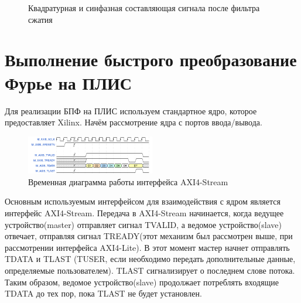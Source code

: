 \begin{figure}[h]
    \centering
    \noindent
    \caption{Квадратурная и синфазная составляющая сигнала после фильтра сжатия}
    \label{fig:correl}
\end{figure}

\section{Выполнение быстрого преобразование Фурье на ПЛИС}

Для реализации БПФ на ПЛИС используем стандартное ядро, которое предоставляет Xilinx. 
Начём рассмотрение ядра с портов ввода/вывода. 

\begin{figure}[h]
	\centering
	\includegraphics[width=0.5\textwidth]{image/AXI-stream.png}
	\caption{Временная диаграмма работы интерфейса AXI4-Stream}
	\label{fft_detailed_implem}
\end{figure}

Основным используемым интерфейсом для взаимодействия с ядром является интерфейс AXI4-Stream.  Передача в AXI4-Stream начинается, когда ведущее устройство(master) отправляет сигнал TVALID, а ведомое устройство(slave) отвечает, отправляя сигнал TREADY(этот механизм был рассмотрен выше, при рассмотрении интерфейса AXI4-Lite). В этот момент мастер начнет отправлять TDATA и TLAST (TUSER, если необходимо передать дополнительные данные, определяемые пользователем). TLAST сигнализирует о последнем слове потока. Таким образом, ведомое устройство(slave) продолжает потреблять входящие TDATA до тех пор, пока TLAST не будет установлен.

